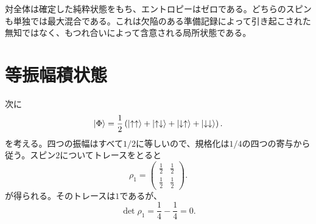 対全体は確定した純粋状態をもち、エントロピーはゼロである。どちらのスピンも単独では最大混合である。これは欠陥のある準備記録によって引き起こされた無知ではなく、もつれ合いによって含意される局所状態である。

\section{等振幅積状態}

次に
\begin{equation}
\left\lvert\Phi\right\rangle
=\frac12\left(
\left\lvert\uparrow\uparrow\right\rangle
+\left\lvert\uparrow\downarrow\right\rangle
+\left\lvert\downarrow\uparrow\right\rangle
+\left\lvert\downarrow\downarrow\right\rangle
\right).
\end{equation}
を考える。四つの振幅はすべて\(1/2\)に等しいので、規格化は\(1/4\)の四つの寄与から従う。スピン\(2\)についてトレースをとると
\begin{equation}
\rho_1
=
\begin{pmatrix}
\frac12&\frac12\\[2pt]
\frac12&\frac12
\end{pmatrix}.
\end{equation}
が得られる。そのトレースは\(1\)であるが、
\begin{equation}
\det\rho_1
=\frac14-\frac14
=0.
\end{equation}

\begin{classroomqa}
\end{classroomqa}

\begin{classroomqa}
\end{classroomqa}


